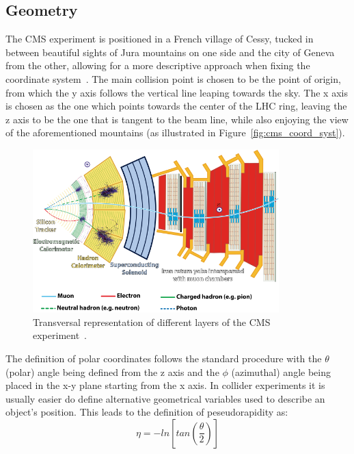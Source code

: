 \subsection{Geometry}
\label{sec:geometry}
\hspace{10pt} The CMS experiment is positioned in a French village of Cessy, tucked in between beautiful sights of Jura mountains on one side and the city of Geneva from the other, allowing for a more descriptive approach when fixing the coordinate system~\cite{cms:tdr}. The main collision point is chosen to be the point of origin, from which the y axis follows the vertical line leaping towards the sky. The x axis is chosen as the one which points towards the center of the LHC ring, leaving the z axis to be the one that is tangent to the beam line, while also enjoying the view of the aforementioned mountains (as illustrated in Figure~\ref{fig:cms_coord_syst}).
\begin{figure}[htbp]
  \centering
    \includegraphics[width=0.85\textwidth]{CMS_experiment/CMSslice_whiteBackground.png}
  \caption[Transversal representation of different layers of the CMS experiment.]{Transversal representation of different layers of the CMS experiment~\cite{zCMS_slice}.}
  \label{fig:cms_slice}
\end{figure}
The definition of polar coordinates follows the standard procedure with the $\theta$ (polar) angle being defined from the z axis and the $\phi$ (azimuthal) angle being placed in the x-y plane starting from the x axis. In collider experiments it is usually easier do define alternative geometrical variables used to describe an object's position. This leads to the definition of peseudorapidity as: 
\begin{equation}
\eta = -ln\left [tan\left (\frac{\theta}{2}\right ) \right]
\end{equation}
